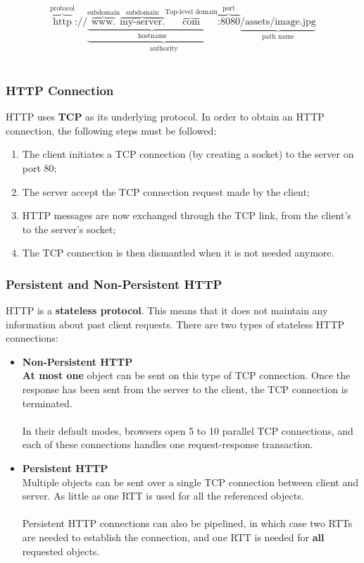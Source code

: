 \documentclass{article}
\begin{document}
\[ \overbrace{\text{http}}^\text{protocol} \text{://} \underbrace{\underbrace{\overbrace{\text{www.}}^\text{subdomain} \overbrace{\text{my-server.}}^\text{subdomain} \overbrace{\text{com}}^\text{Top-level domain}}_\text{hostname} \overbrace{\text{:8080}}^\text{port}}_\text{authority} \underbrace{\text{/assets/image.jpg}}_\text{path name} \] \

\subsubsection{HTTP Connection}
HTTP uses \textbf{TCP} as its underlying protocol. In order to obtain an HTTP connection, the following steps must be followed:

\begin{enumerate}
	\item The client initiates a TCP connection (by creating a socket) to the server on port 80;
	\item The server accept the TCP connection request made by the client;
	\item HTTP messages are now exchanged through the TCP link, from the client's to the server's socket;
	\item The TCP connection is then dismantled when it is not needed anymore. 
\end{enumerate}

\subsubsection{Persistent and Non-Persistent HTTP}
HTTP is a \textbf{stateless protocol}. This means that it does not maintain any information about past client requests. There are two types of stateless HTTP connections:

\begin{itemize}
	\item \textbf{Non-Persistent HTTP}
	\vspace{.2cm} \\
	\textbf{At most one} object can be sent on this type of TCP connection. Once the response has been sent from the server to the client, the TCP connection is terminated. \\ \\
	In their default modes, browsers open 5 to 10 parallel TCP connections, and each of these connections handles one request-response transaction.
	
	\item \textbf{Persistent HTTP}
	\vspace{.2cm} \\
	Multiple objects can be sent over a single TCP connection between client and server. As little as one RTT is used for all the referenced objects. \\ \\
	Persistent HTTP connections can also be pipelined, in which case two RTTs are needed to establish the connection, and one RTT is needed for \textbf{all} requested objects.
\end{itemize}
\end{document}
